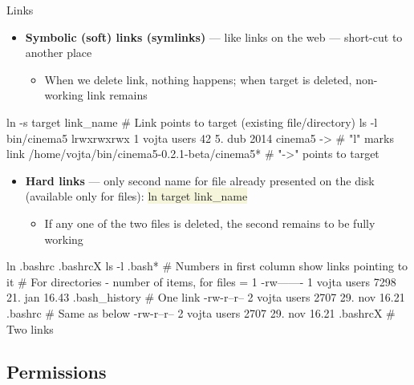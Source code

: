 \documentclass[compress, xelatex, 11pt, xcolor=svgnames, aspectratio=169, url={hyphens, lowtilde}]{beamer}
\renewcommand{\texttt}[1]{\colorbox{Beige}{{\ttfamily #1}}}
\begin{document}
\begin{frame}[fragile]{Links}
	\label{links}
	\begin{itemize}
		\item \textbf{Symbolic (soft) links (symlinks)} --- like links on the web --- short-cut to another place
		\begin{itemize}
			\item When we delete link, nothing happens; when target is deleted, non-working link remains
		\end{itemize}
	\end{itemize}
	\vfill
	\begin{bashcode}
    ln -s target link_name # Link points to target (existing file/directory)
    ls -l bin/cinema5
    lrwxrwxrwx 1 vojta users 42 5. dub 2014 cinema5 -> # "l" marks link
      /home/vojta/bin/cinema5-0.2.1-beta/cinema5*      # "->" points to target
	\end{bashcode}
	\vfill
	\begin{itemize}
		\item \textbf{Hard links} --- only second name for file already presented on the disk (available only for files): \texttt{ln target link\_name}
		\begin{itemize}
			\item If any one of the two files is deleted, the second remains to be fully working
		\end{itemize}
	\end{itemize}
	\vfill
	\begin{bashcode}
    ln .bashrc .bashrcX
    ls -l .bash* # Numbers in first column show links pointing to it
                 # For directories - number of items, for files = 1
    -rw------- 1 vojta users 7298 21. jan 16.43 .bash_history # One link
    -rw-r--r-- 2 vojta users 2707 29. nov 16.21 .bashrc       # Same as below
    -rw-r--r-- 2 vojta users 2707 29. nov 16.21 .bashrcX      # Two links
	\end{bashcode}
\end{frame}

\subsection{Permissions}
\end{document}
